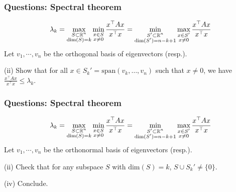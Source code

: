 \documentclass{beamer}
\begin{document}
\begin{frame}[t]
\frametitle{Questions: Spectral theorem}
\vspace{-15pt}
\begin{align*}
\lambda_k = \max_{\substack{S \subset \mathbb{R}^n \\ \text{dim}(S) = k}} \min_{\substack{x \in S \\ x \neq 0}} \frac{x^\top A x}{x^\top x} = \min_{\substack{S' \subset \mathbb{R}^n \\ \text{dim}(S') = n-k+1}} \max_{\substack{x \in S' \\ x \neq 0}} \frac{x^\top A x}{x^\top x}
\end{align*}
Let $v_1, \cdots, v_n$ be the orthogonal basis of eigenvectors (resp.).

(ii) Show that for all $x \in S_k' = \text{span}(v_k, \dots, v_n)$ such that $x \neq 0$, we have  $\frac{x^\top A x}{x^\top x} \leq \lambda_k$.
\end{frame}

\begin{frame}[t]
\frametitle{Questions: Spectral theorem}
\vspace{-15pt}
\begin{align*}
\lambda_k = \max_{\substack{S \subset \mathbb{R}^n \\ \text{dim}(S) = k}} \min_{\substack{x \in S \\ x \neq 0}} \frac{x^\top A x}{x^\top x} = \min_{\substack{S' \subset \mathbb{R}^n \\ \text{dim}(S') = n-k+1}} \max_{\substack{x \in S' \\ x \neq 0}} \frac{x^\top A x}{x^\top x}
\end{align*}
Let $v_1, \cdots, v_n$ be the orthonormal basis of eigenvectors (resp.).

(ii) Check that for any subspace $S$ with $\text{dim}(S) = k$, $S \cup S_k' \neq \{0\}$.

(iv) Conclude.
\end{frame}
\fi

\iffalse
\begin{frame}[t]
\frametitle{Extra question: Spectral theorem}
For a symmetric matrix, show how you can use a modification of Gaussian elimination to find a decomposition $A = V \Lambda V^\top$ for some diagonal matrix $\Lambda$.
\end{frame}
\fi

\begin{frame}[t]

\end{frame}

\begin{frame}[t]

\end{frame}

\begin{frame}[t]

\end{frame}

\begin{frame}[t]

\end{frame}
\end{document}
